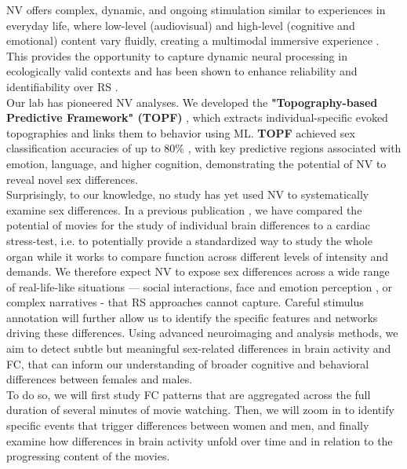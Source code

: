 \documentclass[11pt,a4paper]{article}
\begin{document}
NV offers complex, dynamic, and ongoing stimulation similar to experiences in everyday life, 
where low-level (audiovisual) and high-level (cognitive and emotional) content vary fluidly, 
creating a multimodal immersive experience \parencite{sonkusareNaturalisticStimuliNeuroscience2019}. 
This provides the opportunity to capture dynamic neural processing in ecologically valid contexts 
\parencite{vanderwalMoviesMagnetNaturalistic2019} and has been shown to enhance reliability and identifiability 
over RS \parencite{krollNaturalisticViewingIncreases2023}.\\
Our lab has pioneered NV analyses. We developed the \textbf{"Topography-based Predictive Framework" (TOPF)}
\parencite{liTopographybasedPredictiveFramework2023a}, which extracts individual-specific evoked 
topographies and links them to behavior using ML.
\textbf{TOPF} achieved sex classification accuracies of up to 80\% \parencite{liStimulusSelectionInfluences2025a}, 
with key predictive regions associated with emotion, language, and higher cognition, demonstrating the potential of NV to 
reveal novel sex differences.\\
Surprisingly, to our knowledge, no study has yet used NV to systematically examine sex differences. 
In a previous publication \parencite{eickhoffClinicalApplicationsMovie2020a}, we have compared the potential of 
movies for the study of individual brain differences to a cardiac stress-test, 
i.e. to potentially provide a standardized way to study the whole organ while it works to compare function 
across different levels of intensity and demands. 
We therefore expect NV to expose sex differences across a wide range of real-life-like situations — social interactions, 
face and emotion perception \parencite{sonkusareNaturalisticStimuliNeuroscience2019}, 
or complex narratives - that RS approaches cannot capture. Careful stimulus annotation will further allow us to identify the 
specific features and networks driving these differences.
Using advanced neuroimaging and analysis methods, we aim to detect subtle but meaningful sex-related differences 
in brain activity and FC, that can inform our understanding of 
broader cognitive and behavioral differences between females and males.\\
To do so, we will first study FC patterns that are aggregated across the full duration of several minutes of movie watching. 
Then, we will zoom in to
identify specific events that trigger differences between women and men, and finally examine how differences in brain activity
unfold over time and in relation to the progressing content of the movies.\\
\end{document}

